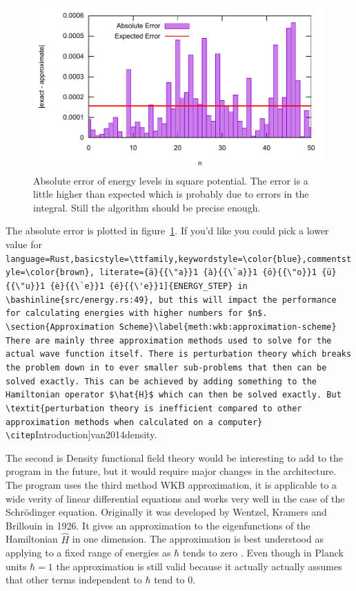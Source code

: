 \documentclass[11pt,DIV=10,final]{scrreprt} %
\providecommand{\rustinline}{\lstinline[language=Rust,basicstyle=\ttfamily,keywordstyle=\color{blue},commentstyle=\color{brown}, literate={ä}{{\"a}}1 {à}{{\`a}}1 {ö}{{\"o}}1 {ü}{{\"u}}1 {è}{{\`e}}1 {é}{{\'e}}1]} % für Inline-C++ Code
\providecommand{\bashinline}{\lstinline[language=bash,basicstyle=\ttfamily,keywordstyle=\color{blue},commentstyle=\color{brown}, literate={ä}{{\"a}}1 {à}{{\`a}}1 {ö}{{\"o}}1 {ü}{{\"u}}1 {è}{{\`e}}1 {é}{{\'e}}1]} % für Inline-C++ Code
\begin{document}
\begin{figure}[H]
  \centering
  \includegraphics[width=\textwidth]{plots/energy_error.pdf}
  \caption{Absolute error of energy levels in square potential. The error is a little higher than expected which is probably due to errors in the integral. Still the algorithm should be precise
    enough.}\label{fig:energy-error}
\end{figure}
The absolute error is plotted in figure~\ref{fig:energy-error}.  If you'd like you could pick a lower value for \rustinline{ENERGY_STEP} in \bashinline{src/energy.rs:49}, but this will impact the performance for calculating energies with higher numbers for $n$.

\section{Approximation Scheme}\label{meth:wkb:approximation-scheme}
There are mainly three approximation methods used to solve for the actual wave function itself. There is perturbation theory which breaks the problem down in to ever smaller sub-problems that then can be
solved exactly. This can be achieved by adding something to the Hamiltonian operator $\hat{H}$ which can then be solved exactly. But \textit{perturbation theory is inefficient compared to other approximation
methods when calculated on a computer} \citep[Introduction]{van2014density}.

The second is Density functional field theory would be interesting to add to the program in the future, but it would require major changes in the architecture.
\\

The program uses the third method WKB approximation, it is applicable to a wide verity of linear differential equations and works very well in the case of the Schrödinger equation.
Originally it was developed by Wentzel, Kramers and Brillouin in 1926. It gives an approximation to the eigenfunctions of the Hamiltonian $\hat{H}$ in one dimension. The approximation is best
understood as applying to a fixed range of energies as $\hbar$ tends to zero \citep[p.~305]{hall2013quantum}. Even though in Planck units $\hbar = 1$ the approximation is still valid because it actually
actually assumes that other terms independent to $\hbar$ tend to 0.
\\
\end{document}
